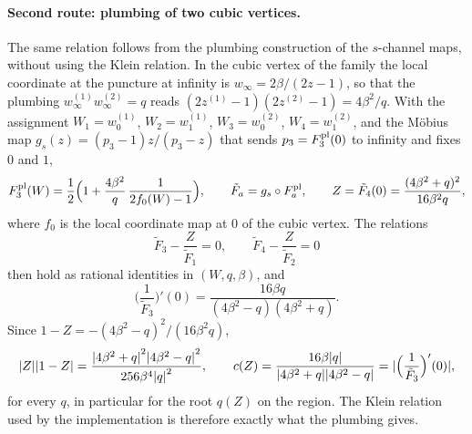 \paragraph{Second route: plumbing of two cubic vertices.}
The same relation follows from the plumbing construction of the $s$-channel maps, without using the Klein relation.
In the cubic vertex of the family the local coordinate at the puncture at infinity is $w_\infty = 2 \beta / (2 z - 1)$, so that the plumbing $w^{(1)}_\infty w^{(2)}_\infty = q$ reads $(2 z^{(1)} - 1)(2 z^{(2)} - 1) = 4 \beta^2 / q$.
With the assignment $W_1 = w^{(1)}_0$, $W_2 = w^{(1)}_1$, $W_3 = w^{(2)}_0$, $W_4 = w^{(2)}_1$, and the Möbius map $g_s(z) = (p_3 - 1) z / (p_3 - z)$ that sends $p_3 = F_3^{\rm pl}(0)$ to infinity and fixes $0$ and $1$,
\begin{equation}
  F_3^{\rm pl}(W)
    = \frac{1}{2} \Big( 1 + \frac{4 \beta^2}{q} \, \frac{1}{2 f_0(W) - 1} \Big),
  \qquad
  \tilde F_a
    = g_s \circ F_a^{\rm pl},
  \qquad
  Z
    = \tilde F_4(0)
    = \frac{(4 \beta^2 + q)^2}{16 \beta^2 q},
\end{equation}
where $f_0$ is the local coordinate map at $0$ of the cubic vertex.
The relations
\begin{equation}
  \tilde F_3 - \frac{Z}{\tilde F_1}
    = 0,
  \qquad
  \tilde F_4 - \frac{Z}{\tilde F_2}
    = 0
\end{equation}
then hold as rational identities in $(W, q, \beta)$, and
\begin{equation}
  \Big( \frac{1}{\tilde F_3} \Big)'(0)
    = \frac{16 \beta q}{(4 \beta^2 - q)(4 \beta^2 + q)}.
\end{equation}
Since $1 - Z = - (4 \beta^2 - q)^2 / (16 \beta^2 q)$,
\begin{equation}
  {|Z|} {|1 - Z|}
    = \frac{{|4 \beta^2 + q|}^2 {|4 \beta^2 - q|}^2}{256 \beta^4 {|q|}^2},
  \qquad
  c(Z)
    = \frac{16 \beta {|q|}}{{|4 \beta^2 + q|} {|4 \beta^2 - q|}}
    = {|\Big( \frac{1}{\tilde F_3} \Big)'(0)|},
\end{equation}
for every $q$, in particular for the root $q(Z)$ on the region.
The Klein relation used by the implementation is therefore exactly what the plumbing gives.

